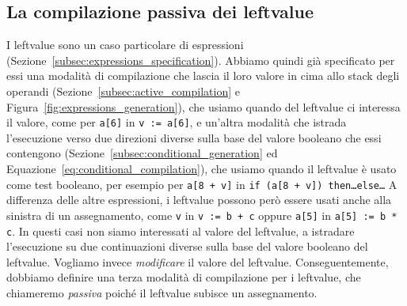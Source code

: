 \subsection{La compilazione passiva dei leftvalue}
  \label{subsec:passive_generation}
%
I leftvalue sono un caso particolare di espressioni
(Sezione~\ref{subsec:expressions_specification}). Abbiamo quindi gi\`a
specificato per essi una modalit\`a di compilazione che lascia il loro
valore in cima allo stack degli operandi
(Sezione~\ref{subsec:active_compilation} e
Figura~\ref{fig:expressions_generation}), che usiamo quando
del leftvalue ci interessa il valore, come per \texttt{a[6]} in
\texttt{v := a[6]}, e un'altra modalit\`a che
istrada l'esecuzione verso due direzioni diverse sulla base del valore
booleano che essi contengono (Sezione~\ref{subsec:conditional_generation}
ed Equazione~\ref{eq:conditional_compilation}),
che usiamo quando il leftvalue \`e usato come test booleano, per esempio
per \texttt{a[8 + v]} in \texttt{if (a[8 + v]) then\ldots else\ldots}
A differenza delle altre espressioni, i leftvalue possono per\`o
essere usati anche
alla sinistra di un assegnamento, come \texttt{v} in \texttt{v := b + c}
oppure \texttt{a[5]} in \texttt{a[5] := b * c}. In questi casi non siamo
interessati al valore del leftvalue, \nec a istradare l'esecuzione
su due continuazioni diverse sulla base del valore booleano del leftvalue.
Vogliamo invece \emph{modificare} il valore del leftvalue. Conseguentemente,
dobbiamo definire una terza modalit\`a di compilazione per i leftvalue,
che chiameremo \emph{passiva} poich\'e il leftvalue subisce un assegnamento.


